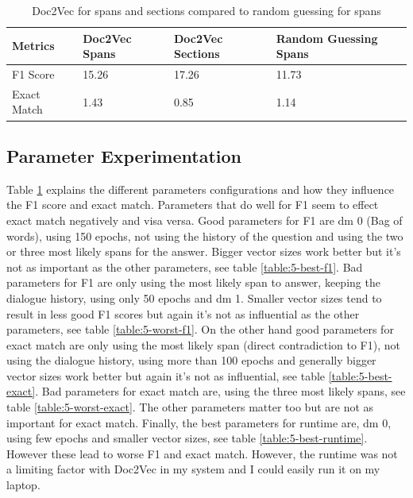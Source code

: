 \documentclass[11pt]{article}
\begin{document}
    \begin{table}[h!]
        \centering
        \begin{tabular}{|l|l|l|l|}
            \hline
            Metrics     & Doc2Vec Spans & Doc2Vec Sections & Random Guessing Spans \\ \hline
            F1 Score    & 15.26         & 17.26            & 11.73                 \\ \hline
            Exact Match & 1.43          & 0.85             & 1.14                  \\ \hline
        \end{tabular}
        \caption{Doc2Vec for spans and sections compared to random guessing for spans}
        \label{table:simple-doc2vec-results}
    \end{table}

    \subsection{Parameter Experimentation}\label{subsec:experimentation-results}

    Table \ref{table:simple-doc2vec-results} explains the different parameters configurations and how they influence
    the F1 score and exact match. Parameters that do well for F1 seem to effect exact match negatively and
    visa versa. Good parameters for F1 are dm 0 (Bag of words), using 150 epochs, not using the history of the question
    and using the two or three most likely spans for the answer. Bigger vector sizes work better but it's not as
    important as the other parameters, see table \ref{table:5-best-f1}. Bad parameters for F1 are only using the most likely span to answer,
    keeping the dialogue history, using only 50 epochs and dm 1. Smaller vector sizes tend to result in less good F1 scores
    but again it's not as influential as the other parameters, see table \ref{table:5-worst-f1}. On the other hand good parameters for exact match are
    only using the most likely span (direct contradiction to F1), not using the dialogue history,
    using more than 100 epochs and generally bigger vector sizes work better but again it's not as influential, see table
    \ref{table:5-best-exact}. Bad parameters
    for exact match are, using the three most likely spans, see table \ref{table:5-worst-exact}.
    The other parameters matter too but are not as important for exact match. Finally, the best parameters for runtime are,
    dm 0, using few epochs and smaller vector sizes, see table \ref{table:5-best-runtime}. However these lead to worse F1 and exact match. However, the
    runtime was not a limiting factor with Doc2Vec in my system and I could easily run it on my laptop.
\end{document}
